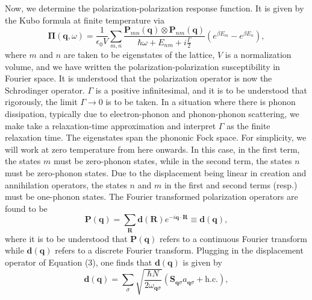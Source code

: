 \documentclass[superscriptaddress,reprint,prb]{revtex4-1}
\begin{document}
Now, we determine the polarization-polarization response function. It is given by the Kubo formula at finite temperature via
\begin{equation}
\boldsymbol{\Pi}(\mathbf{q},\omega) =  \frac{1}{\epsilon_0 V}\sum\limits_{m,n}\frac{\mathbf{P}_{mn}(\mathbf{q})\otimes\mathbf{P}_{nm}(\mathbf{q})}{\hbar\omega + E_{nm}+i\frac{\Gamma}{2}}\left(e^{\beta E_m}-e^{\beta E_n} \right),
\end{equation}
where $m$ and $n$ are taken to be eigenstates of the lattice, $V$ is a normalization volume, and we have written the polarization-polarization susceptibility in Fourier space. It is  understood that the polarization operator is now the Schrodinger operator. $\Gamma$ is a positive infinitesimal, and it is to be understood that rigorously, the limit $\Gamma \rightarrow 0$ is to be taken. In a situation where there is phonon dissipation, typically due to electron-phonon and phonon-phonon scattering, we make take a relaxation-time approximation and interpret $\Gamma$ as the finite relaxation time.   The eigenstates span the phononic Fock space. For simplicity, we will work at zero temperature from here onwards. In this case, in the first term, the states $m$ must be zero-phonon states, while in the second term, the states $n$ must be zero-phonon states. Due to the displacement being linear in creation and annihilation operators, the states $n$ and $m$ in the first and second terms (resp.) must be one-phonon states. The Fourier transformed polarization operators are found to be
\begin{equation}
\mathbf{P}(\mathbf{q}) = \sum\limits_{\mathbf{R}}\mathbf{d}(\mathbf{R})e^{-i\mathbf{q}\cdot\mathbf{R}} \equiv \mathbf{d}(\mathbf{q}),
\end{equation}
where it is to be understood that $\mathbf{P}(\mathbf{q})$ refers to a continuous Fourier transform while $\mathbf{d}(\mathbf{q})$ refers to a discrete Fourier transform. Plugging in the displacement operator of Equation (3), one finds that $\mathbf{d}(\mathbf{q})$ is given by
\begin{equation}
\mathbf{d}(\mathbf{q}) = \sum\limits_{\sigma}\sqrt{\frac{\hbar N}{2\omega_{\mathbf{q}\sigma}}} \left(\mathbf{S}_{\mathbf{q}\sigma}a_{\mathbf{q}\sigma} + \text{h.c.}\right),
\end{equation}
\end{document}
